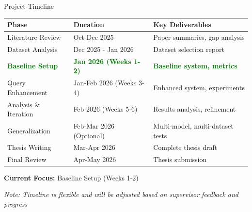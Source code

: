 \documentclass[aspectratio=169]{beamer}
\begin{document}
\begin{frame}{Project Timeline}
\begin{table}
\small
\begin{tabular}{lll}
\toprule
\textbf{Phase} & \textbf{Duration} & \textbf{Key Deliverables} \\
\midrule
Literature Review & Oct-Dec 2025 & Paper summaries, gap analysis \\
Dataset Analysis & Dec 2025 - Jan 2026 & Dataset selection report \\
\textcolor{green}{\textbf{Baseline Setup}} & \textcolor{green}{\textbf{Jan 2026 (Weeks 1-2)}} & \textcolor{green}{\textbf{Baseline system, metrics}} \\
Query Enhancement & Jan-Feb 2026 (Weeks 3-4) & Enhanced system, experiments \\
Analysis \& Iteration & Feb 2026 (Weeks 5-6) & Results analysis, refinement \\
Generalization & Feb-Mar 2026 (Optional) & Multi-model, multi-dataset tests \\
Thesis Writing & Mar-Apr 2026 & Complete thesis draft \\
Final Review & Apr-May 2026 & Thesis submission \\
\bottomrule
\end{tabular}
\end{table}

\vspace{0.3cm}

\textbf{Current Focus:} Baseline Setup (Weeks 1-2)

\vspace{0.3cm}

\textit{Note: Timeline is flexible and will be adjusted based on supervisor feedback and progress}
\end{frame}
\end{document}
